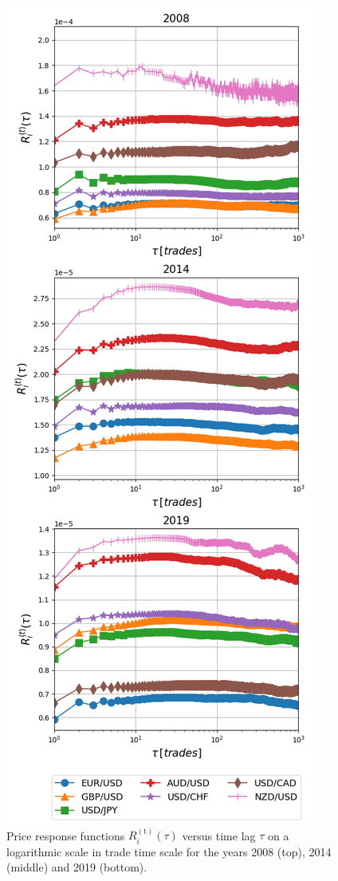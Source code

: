 \begin{figure}[htbp]
    \centering
    \includegraphics[width=\columnwidth]
    {figures/04_responses_trade_scale.png}
    \caption{Price response functions
             $R^{\left(\textrm{t}\right)}_{i}\left(\tau\right)$ versus time
             lag $\tau$ on a logarithmic scale in trade time scale for the
             years 2008 (top), 2014 (middle) and 2019 (bottom).}
    \label{fig:response_function_trade_scale}
\end{figure}

